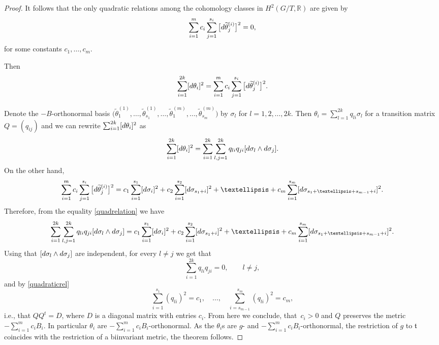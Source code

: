 \documentclass[11pt]{article}
\numberwithin{equation}{section}
\numberwithin{equation}{section}
\begin{document}
\begin{proof}
It follows that the only quadratic relations among the cohomology classes in $H^2(G/T, \mathbb{R})$ are given by
\begin{equation}\label{quadraticrel}
 \sum_{i=1}^m c_i\sum_{j=1}^{s_i} \big[{\rm d}\widetilde{\theta}^{(i)}_j\big]^2 = 0, \end{equation} for some constants $c_1, \dots, c_m$.

Then
\begin{equation} \label{quadrelation}
\sum_{i=1}^{2k} [{\rm d}\theta_i]^2 = \sum_{i=1}^m c_i\sum_{j=1}^{s_i} \big[{\rm d}\widetilde{\theta}^{(i)}_j\big]^2.
\end{equation}

Denote the $-B$-orthonormal basis $\big(\widetilde{\theta}_1^{(1)}, \dots, \widetilde{\theta}_{s_1}^{(1)}, \dots, \widetilde{\theta}_1^{(m)}, \dots, \widetilde{\theta}_{s_m}^{(m)}\big)$ by $\sigma_l$ for $l=1,2,\dots ,2k$. Then $\theta_i = \sum_{l=1}^{2k} q_{li}\sigma_l$ for a transition matrix $Q = (q_{ij})$
and we can rewrite $\sum_{i=1}^{2k} [{\rm d}\theta_i]^2$ as
\[
\sum_{i=1}^{2k} [{\rm d}\theta_i]^2 = \sum_{i = 1}^{2k} \sum_{l,j =1}^{2k} q_{li} q_{ji} [{\rm d}\sigma_l \wedge {\rm d} \sigma_j].
\]
 On the other hand,
\[
 \sum_{i=1}^m c_i\sum_{j=1}^{s_i} \big[{\rm d}\widetilde{\theta}^{(i)}_j\big]^2 = c_1 \sum_{i =1}^{s_1} [{\rm d} \sigma_i]^2 + c_2 \sum_{i =1}^{s_2} [{\rm d} \sigma_{s_1 +i}]^2 + \dots + c_m \sum_{i =1}^{s_m} [{\rm d} \sigma_{s_1 + \dots + s_{m-1} + i} ]^2.
\]
Therefore, from the equality \eqref{quadrelation} we have
\[
 \sum_{i = 1}^{2k} \sum_{l,j =1}^{2k} q_{li} q_{ji} [{\rm d} \sigma_l \wedge {\rm d} \sigma_j] = c_1 \sum_{i =1}^{s_1} [{\rm d} \sigma_i]^2 + c_2 \sum_{i =1}^{s_2} [{\rm d} \sigma_{s_1 +i}]^2 + \dots + c_m \sum_{i =1}^{s_m} [{\rm d} \sigma_{s_1 + \dots + s_{m-1} + i} ]^2.
\]
Using that $[{\rm d}\sigma_l\wedge {\rm d}\sigma_j]$ are independent, for every $l\neq j$ we get that
\[
\sum_{i = 1}^{2k} q_{li} q_{ji} =0, \qquad l \neq j,
\]
and by \eqref{quadraticrel}
\[
\sum_{i =1}^{s_1} (q_{li})^2 = c_1, \quad \dots, \quad \sum_{i =s_{m-1}}^{s_m} (q_{li})^2 = c_m,
\]
i.e., that $QQ^t= D$, where $D$ is a diagonal matrix with entries $c_i$. From here we conclude, that~$c_i > 0$ and $Q$ preserves the metric $-\sum_{i = 1}^m c_i B_i$. In particular $\theta_i$ are $-\sum_{i=1}^m c_i B_i$-or\-thonor\-mal. As the $\theta_i$s are $g$- and $-\sum_{i=1}^m c_i B_i$-orthonormal, the restriction of $g$ to $\mathfrak t$ coincides with the restriction of a biinvariant metric, the theorem follows.
\end{proof}
\end{document}
